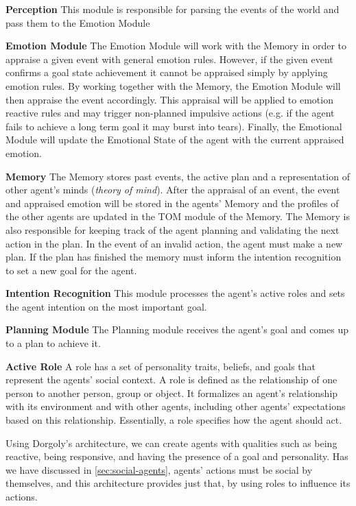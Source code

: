 \begin{description}
\item \textbf{Perception} This module is responsible for parsing the events of the world and pass them to the Emotion Module
\item \textbf{Emotion Module} The Emotion Module will work with the Memory in order to appraise a given event with general emotion rules.
However, if the given event confirms a goal state achievement it cannot be appraised simply by applying emotion rules.
By working together with the Memory, the Emotion Module will then appraise the event accordingly.
This appraisal will be applied to emotion reactive rules and may trigger non-planned impulsive actions (e.g. if the agent fails to achieve a long term goal it may burst into tears).
Finally, the Emotional Module will update the Emotional State of the agent with the current appraised emotion.
\item \textbf{Memory} The Memory stores past events, the active plan and a representation of other agent's minds (\textit{theory of mind}).
After the appraisal of an event, the event and appraised emotion will be stored in the agents' Memory and the profiles of the other agents are updated in the TOM module of the Memory.
The Memory is also responsible for keeping track of the agent planning and validating the next action in the plan.
In the event of an invalid action, the agent must make a new plan.
If the plan has finished the memory must inform the intention recognition to set a new goal for the agent.
\item \textbf{Intention Recognition} This module processes the agent's active roles and sets the agent intention on the most important goal.
\item \textbf{Planning Module} The Planning module receives the agent's goal and comes up to a plan to achieve it.
\item \textbf{Active Role} A role has a set of personality traits, beliefs, and goals that represent the agents' social context.
A role is defined as the relationship of one person to another person, group or object.
It formalizes an agent's relationship with its environment and with other agents, including other agents' expectations based on this relationship.
Essentially, a role specifies how the agent should act. 
\end{description}

Using Dorgoly's architecture, we can create agents with qualities such as being reactive, being responsive, and having the presence of a goal and personality.
Has we have discussed in \ref{sec:social-agents}, agents' actions must be social by themselves, and this architecture provides just that, by using roles to influence its actions.
